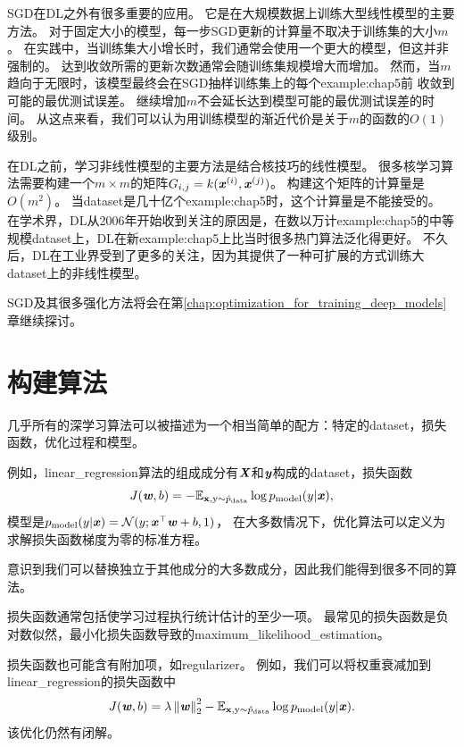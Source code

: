 
\gls{SGD}在\gls{DL}之外有很多重要的应用。
它是在大规模数据上训练大型线性模型的主要方法。
对于固定大小的模型，每一步\gls{SGD}更新的计算量不取决于训练集的大小$m$。
在实践中，当训练集大小增长时，我们通常会使用一个更大的模型，但这并非强制的。
达到收敛所需的更新次数通常会随训练集规模增大而增加。
然而，当$m$趋向于无限时，该模型最终会在\gls{SGD}抽样训练集上的每个\gls{example:chap5}前
收敛到可能的最优测试误差。
继续增加$m$不会延长达到模型可能的最优测试误差的时间。
从这点来看，我们可以认为用训练模型的渐近代价是关于$m$的函数的$O(1)$级别。

在\gls{DL}之前，学习非线性模型的主要方法是结合核技巧的线性模型。
很多核学习算法需要构建一个$m\times m$的矩阵$G_{i,j}=k(\boldsymbol{\mathit{x}}^{(i)}, \boldsymbol{\mathit{x}}^{(j)})$。
构建这个矩阵的计算量是$O(m^2)$。
当\gls{dataset}是几十亿个\gls{example:chap5}时，这个计算量是不能接受的。
在学术界，\gls{DL}从2006年开始收到关注的原因是，在数以万计\gls{example:chap5}的中等规模\gls{dataset}上，\gls{DL}在新\gls{example:chap5}上比当时很多热门算法泛化得更好。
不久后，\gls{DL}在工业界受到了更多的关注，因为其提供了一种可扩展的方式训练大\gls{dataset}上的非线性模型。

\gls{SGD}及其很多强化方法将会在第\ref{chap:optimization_for_training_deep_models}章继续探讨。

\section{构建算法}
\label{sec:building_a_machine_learning_algorithm}
几乎所有的深学习算法可以被描述为一个相当简单的配方：特定的\gls{dataset}，损失函数，优化过程和模型。

例如，\gls{linear_regression}算法的组成成分有$\boldsymbol{\mathit{X}}$和$\boldsymbol{\mathit{y}}$构成的\gls{dataset}，损失函数
\begin{equation}
    J(\boldsymbol{\mathit{w}}, b) = -\mathbb{E}_{\mathbf{x},\mathrm{y}\sim\hat{p}_{\text{data}}}
    \log p_{\text{model}} (y | \boldsymbol{\mathit{x}}) ,
\end{equation}
模型是$p_{\text{model}} (y | \boldsymbol{\mathit{x}}) = \mathcal{N}(y; \boldsymbol{\mathit{x}}^\top \boldsymbol{\mathit{w}} + b, 1)$，
在大多数情况下，优化算法可以定义为求解损失函数梯度为零的标准方程。

意识到我们可以替换独立于其他成分的大多数成分，因此我们能得到很多不同的算法。


损失函数通常包括使学习过程执行统计估计的至少一项。
最常见的损失函数是负对数似然，最小化损失函数导致的\gls{maximum_likelihood_estimation}。

损失函数也可能含有附加项，如\gls{regularizer}。
例如，我们可以将权重衰减加到\gls{linear_regression}的损失函数中
\begin{equation}
    J(\boldsymbol{\mathit{w}}, b) = \lambda \left\lVert\boldsymbol{\mathit{w}}\right\rVert_2^2 - \mathbb{E}_{\mathbf{x},\mathrm{y}\sim \hat{p}_{\text{data}}}
    \log p_{\text{model}} (y | \boldsymbol{\mathit{x}}) .
\end{equation}
该优化仍然有闭解。

